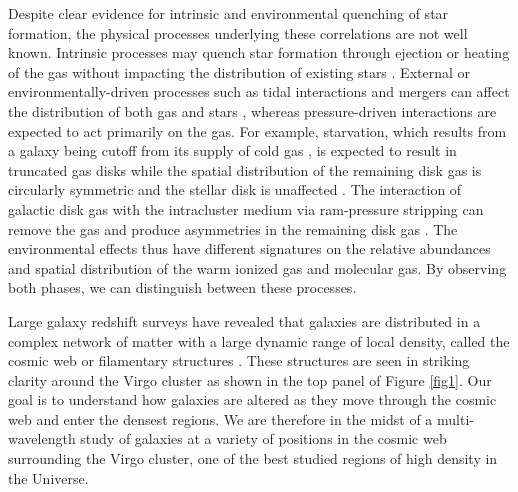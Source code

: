 \documentclass[12pt, preprint]{aastex}
\newcommand{\ha}{$H\alpha$}
\begin{document}



Despite clear evidence for intrinsic and environmental
quenching of star formation, the physical processes underlying these
correlations are not well known. 
Intrinsic processes may quench star formation through
ejection or heating of the gas without impacting the distribution of
existing stars \citep[e.g.][]{springel05,
  croton06, dekel06}.  External or environmentally-driven processes 
such as tidal interactions and
mergers can
affect the distribution of both gas and stars \citep{springel05,
  croton06, dekel06}, whereas pressure-driven interactions are expected to
act primarily on the gas.  For example, starvation, which results from
a galaxy being cutoff from its supply of cold gas \citep{larson80}, is
expected to result in
truncated gas disks while the spatial distribution of the
remaining disk gas is circularly symmetric and the stellar disk is unaffected \citep[e.g.][]{kawata08}. 
The interaction of galactic disk gas with the intracluster medium via
ram-pressure stripping can remove the gas and produce asymmetries in
the remaining disk gas \citep[e.g.][]{quilis00,crowl05}.  
{The environmental effects thus
have different signatures on the relative abundances and spatial
distribution of the warm ionized gas and molecular gas.  By
observing both 
phases, we can distinguish between these processes.}
 

Large galaxy redshift surveys have revealed that galaxies are distributed in a complex network
of matter with a large dynamic range of local density, called the
cosmic web or filamentary structures \citep{kitaura09, darvish14}.  These structures are seen in striking clarity around the
Virgo cluster as shown in the top panel of Figure \ref{fig1}.  Our goal is to understand how 
galaxies are altered as they move through the cosmic web and enter the
densest regions.  We are therefore in the midst of a
multi-wavelength study of galaxies at a variety of positions in the
cosmic web surrounding the Virgo cluster, one of the best studied
regions of high density in the Universe.  
\end{document}
